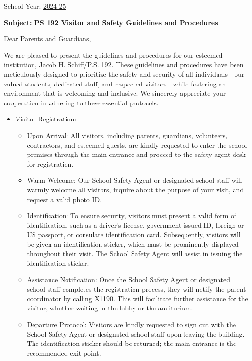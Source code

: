 \documentclass[12pt,letterpaper]{article}
\begin{document}
\vspace*{0.5in}
School Year: \href{https://www.ps192.org}{2024-25} 

\textbf{Subject: PS 192 Visitor and Safety Guidelines and Procedures}

Dear Parents and Guardians,

We are pleased to present the guidelines and procedures for our esteemed institution, Jacob H. Schiff/P.S. 192. These guidelines and procedures have been meticulously designed to prioritize the safety and security of all individuals—our valued students, dedicated staff, and respected visitors—while fostering an environment that is welcoming and inclusive. We sincerely appreciate your cooperation in adhering to these essential protocols.
\begin{itemize}
	\item Visitor Registration:
		\begin{itemize}
		\item Upon Arrival: All visitors, including parents, guardians, 
		volunteers, contractors, and esteemed guests, are kindly requested to
		enter the school premises through the main entrance and proceed to the
		safety agent desk for registration.
		\item Warm Welcome: Our School Safety Agent or designated school staff 
		will warmly welcome all visitors, inquire about the purpose of your
		visit, and request a valid photo ID.
		\item Identification: To ensure security, visitors must present a valid
		form of identification, such as a driver's license, government-issued
		ID, foreign or US passport, or consulate identification card.
		Subsequently, visitors will be given an identification sticker, which
		must be prominently displayed throughout their visit. The School Safety
		Agent will assist in issuing the identification sticker.
		\item Assistance Notification: Once the School Safety Agent or 
		designated school staff completes the registration process, they will
		notify the parent coordinator by calling X1190. This will facilitate
		further assistance for the visitor, whether waiting in the lobby or the
		auditorium.
		\item Departure Protocol: Visitors are kindly requested to sign out with
		the School Safety Agent or designated school staff upon leaving the 
		building. The identification sticker should be returned; the main 
		entrance is the recommended exit point.
		\end{itemize}

\end{itemize}
\end{document}

